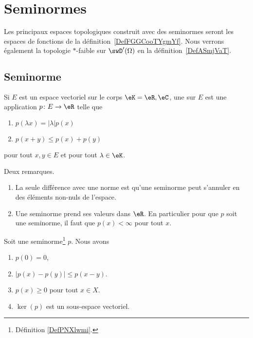 \section{Seminormes}

Les principaux espaces topologiques construit avec des seminormes seront les espaces de fonctions de la définition~\ref{DefFGGCooTYgmYf}. Nous verrons également la topologie \( *\)-faible sur \( \swD'(\Omega)\) en la définition~\ref{DefASmjVaT}.

\subsection{Seminorme}

\begin{definition}  \label{DefPNXlwmi}
	Si \( E\) est un espace vectoriel sur le corps \( \eK=\eR,\eC\), une  sur \( E\) est une application \( p\colon E\to \eR\) telle que
	\begin{enumerate}
		\item   \label{ItemSHnimhDii}
		      \( p(\lambda x)=| \lambda |p(x)\)
		\item   \label{ItemSHnimhDiii}
		      \( p(x+y)\leq p(x)+p(y)\)
	\end{enumerate}
	pour tout \( x,y\in E\) et pour tout \( \lambda\in \eK\).
\end{definition}

\begin{remark}
	Deux remarques.
	\begin{enumerate}
		\item
		      La seule différence avec une norme est qu'une seminorme peut s'annuler en des éléments non-nuls de l'espace.
		\item
		      Une seminorme prend ses valeurs dans \( \eR\). En particulier pour que \( p\) soit une seminorme, il faut que \( p(x)<\infty\) pour tout \( x\).
	\end{enumerate}
\end{remark}

\begin{lemma}		\label{LEMooHTOAooGmRGZL}
	Soit une seminorme\footnote{Définition \ref{DefPNXlwmi}.} \( p\). Nous avons
	\begin{enumerate}
		\item		\label{ITEMooFRCRooZBWTxH}
		      \( p(0)=0\),
		\item		\label{ITEMooHVWHooAVZsTf}
		      \( | p(x)-p(y) |\leq p(x-y)\).
		\item		\label{ITEMooXCHBooDoBvpL}
		      \( p(x)\geq 0\) pour tout \( x\in X\).
		\item	\label{ITEMooQIGMooVNDakF}
		      \( \ker(p)\) est un sous-espace vectoriel.
	\end{enumerate}
\end{lemma}


